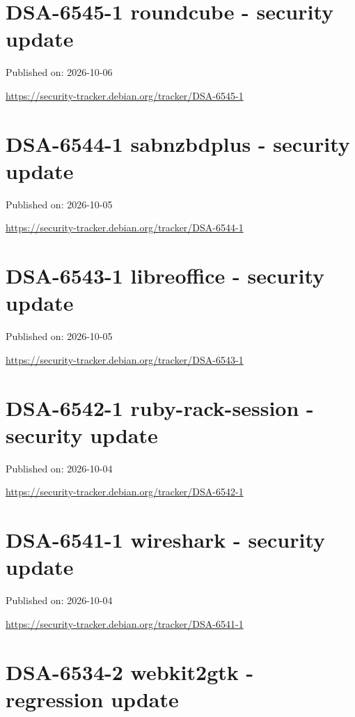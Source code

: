 \documentclass[11pt,a4paper]{article}
\begin{document}
\section{DSA-6545-1 roundcube - security update}

Published on: 2026-10-06

\href{https://security-tracker.debian.org/tracker/DSA-6545-1}{https://security-tracker.debian.org/tracker/DSA-6545-1}

\section{DSA-6544-1 sabnzbdplus - security update}

Published on: 2026-10-05

\href{https://security-tracker.debian.org/tracker/DSA-6544-1}{https://security-tracker.debian.org/tracker/DSA-6544-1}

\section{DSA-6543-1 libreoffice - security update}

Published on: 2026-10-05

\href{https://security-tracker.debian.org/tracker/DSA-6543-1}{https://security-tracker.debian.org/tracker/DSA-6543-1}

\section{DSA-6542-1 ruby-rack-session - security update}

Published on: 2026-10-04

\href{https://security-tracker.debian.org/tracker/DSA-6542-1}{https://security-tracker.debian.org/tracker/DSA-6542-1}

\section{DSA-6541-1 wireshark - security update}

Published on: 2026-10-04

\href{https://security-tracker.debian.org/tracker/DSA-6541-1}{https://security-tracker.debian.org/tracker/DSA-6541-1}

\section{DSA-6534-2 webkit2gtk - regression update}
\end{document}
